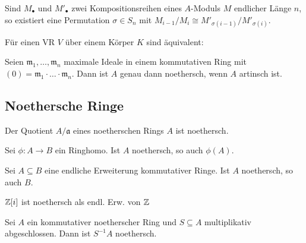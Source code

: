 \documentclass{cheat-sheet}
\newcommand{\aaa}{\mathfrak{a}}
\newcommand{\mmm}{\mathfrak{m}}
\begin{document}
\begin{satz}
  Sind $M_\bullet$ und $M'_\bullet$ zwei Kompositionsreihen eines $A$-Moduls $M$ endlicher Länge $n$, so existiert eine Permutation $\sigma \in S_n$ mit $M_{i-1}/M_i \cong M'_{\sigma(i-1)}/M'_{\sigma(i)}$.
\end{satz}

\begin{prop}
  Für einen VR $V$ über einem Körper $K$ sind äquivalent:
  \begin{itemize}
  \end{itemize}
\end{prop}

\begin{kor}
  Seien $\mmm_1, \ldots, \mmm_n$ maximale Ideale in einem kommutativen Ring mit $(0) = \mmm_1 \cdot \ldots \cdot \mmm_n$.
  Dann ist $A$ genau dann noethersch, wenn $A$ artinsch ist.
\end{kor}

\subsection{Noethersche Ringe}



\begin{prop}
  Der Quotient $A / \aaa$ eines noetherschen Rings $A$ ist noethersch.
\end{prop}

\begin{kor}
  Sei $\phi : A \to B$ ein Ringhomo.
  Ist $A$ noethersch, so auch $\phi(A)$.
\end{kor}

\begin{prop}
  Sei $A \subseteq B$ eine endliche Erweiterung kommutativer Ringe.
  Ist $A$ noethersch, so auch $B$.
\end{prop}

\begin{bsp}
  $\mathbb{Z}[i]$ ist noethersch als endl. Erw. von $\mathbb{Z}$
\end{bsp}

\begin{prop}
  Sei $A$ ein kommutativer noetherscher Ring und $S \subseteq A$ multiplikativ abgeschlossen.
  Dann ist $S^{-1} A$ noethersch.
\end{prop}
\end{document}
